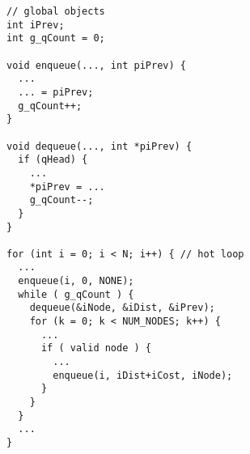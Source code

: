 \begin{lstlisting}[morekeywords={iPrev,piPrev,g_qCount},belowskip=0pt]
// global objects
int iPrev;
int g_qCount = 0;

void enqueue(..., int piPrev) {
  ...
  ... = piPrev;
  g_qCount++;
}

void dequeue(..., int *piPrev) {
  if (qHead) {
    ...
    *piPrev = ...
    g_qCount--;
  }
}

for (int i = 0; i < N; i++) { // hot loop
  ...
  enqueue(i, 0, NONE);
  while ( g_qCount ) {
    dequeue(&iNode, &iDist, &iPrev);
    for (k = 0; k < NUM_NODES; k++) {
      ...
      if ( valid node ) {
        ...
        enqueue(i, iDist+iCost, iNode);
      }
    }
  }
  ...
}

\end{lstlisting}
